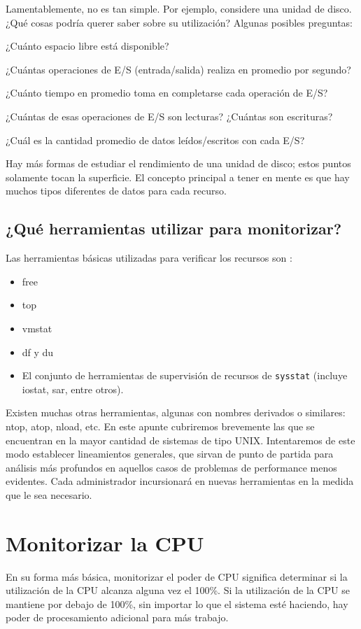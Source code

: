 \documentclass[12pt]{article}
\begin{document}
Lamentablemente, no es tan simple. Por ejemplo, considere una unidad de 
disco. ¿Qué cosas podría querer saber sobre su utilización? Algunas posibles
preguntas: 

¿Cuánto espacio libre está disponible?

¿Cuántas operaciones de E/S (entrada/salida) realiza en promedio por
segundo?

¿Cuánto tiempo en promedio toma en completarse cada operación de E/S?

¿Cuántas de esas operaciones de E/S son lecturas? ¿Cuántas son escrituras?

¿Cuál es la cantidad promedio de datos leídos/escritos con cada E/S?

Hay más formas de estudiar el rendimiento de una unidad de disco; estos 
puntos solamente tocan la superficie. El concepto principal a tener en 
mente es que hay muchos tipos diferentes de datos para cada recurso.


\subsection*{¿Qué herramientas utilizar para monitorizar?}

Las herramientas básicas utilizadas para verificar los recursos son :
\begin{itemize}
\item free
\item top
\item vmstat
\item df y du 
\item El conjunto de herramientas de supervisión de recursos de 
\texttt{sysstat} (incluye iostat, sar, entre otros). 
\end{itemize}

Existen muchas otras herramientas, algunas con nombres derivados o 
similares: ntop, atop, nload, etc. En este apunte cubriremos brevemente
las que se encuentran en la mayor cantidad de sistemas de tipo UNIX.
Intentaremos de este modo establecer lineamientos generales, que sirvan
de punto de partida para análisis más profundos en aquellos casos 
de problemas de performance menos evidentes. Cada administrador incursionará 
en nuevas herramientas en la medida que le sea necesario. 


\section*{Monitorizar la CPU}
En su forma más básica, monitorizar el poder de CPU significa determinar si
 la utilización de la CPU alcanza alguna vez el 100\%. Si la utilización 
de la CPU se mantiene por debajo de 100\%, sin importar lo que el sistema 
esté haciendo, hay poder de procesamiento adicional para más trabajo.
\end{document}
